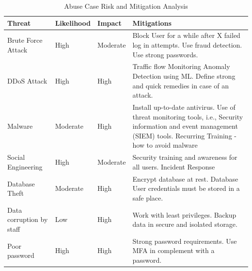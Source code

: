 \begingroup
\centering
\setlength{\tabcolsep}{6.5pt} %
\renewcommand{\arraystretch}{1.8} %
\begin{longtable}{ |p{3cm}|p{3cm}|p{3cm}| p{5cm} |}
 \caption{Abuse Case Risk and Mitigation Analysis}
    \label{table:abuse_case}
 \hline
 \textbf{Threat} & \textbf{Likelihood} & \textbf{Impact} & \textbf{Mitigations} \\ [0.5ex] 
 \hline
 Brute Force Attack & High & Moderate &  Block User for a while after X failed log in attempts.\newline
 Use fraud detection. \newline
 Use strong passwords.
 \citep[p.~682-683]{herley2008protecting}\\
 \hline
 DDoS Attack & High & High & Traffic flow Monitoring\newline
  Anomaly Detection using ML. \newline
  Define strong and quick remedies in case of an attack.
 \citep[p.~1]{DDOS}\\
\hline
   Malware & Moderate & High & Install up-to-date antivirus.\newline
   Use of threat monitoring tools, i.e., Security information and event management (SIEM) tools.\newline
 Recurring Training - how to avoid malware  
  \\
 \hline
 Social Engineering & High & Moderate & Security training and awareness for all users.\newline
 Incident Response \citep[p.~ 13-17]{chantler2008social}
  \\
  \hline
   Database Theft & Moderate & High & Encrypt database at rest.\newline
  Database User credentials must be stored in a safe place.
  \\
  \hline 
     Data corruption by staff & Low & High & Work with least privileges.\newline
  Backup data in secure and isolated storage.
  \\
  \hline
       Poor password & High & High &Strong password requirements.\newline
       Use MFA in complement with a password.
  \\
  \hline

\end{longtable}
\endgroup


